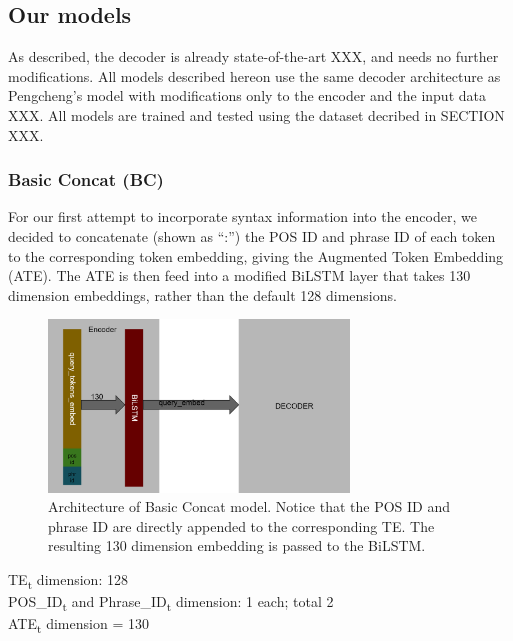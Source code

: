 \documentclass{IEEEtran}
\begin{document}
      \subsection{Our models}
      As described, the decoder is already state-of-the-art XXX, and needs no further 
      modifications. All models described hereon use the same decoder architecture as Pengcheng's 
      model with modifications only to the encoder and the input data XXX. All models are 
      trained and tested using the dataset decribed in SECTION XXX. \\

        \subsubsection{Basic Concat (BC)}
        For our first attempt to incorporate syntax information into the encoder, we decided to 
        concatenate (shown as ``:'') the POS ID and phrase ID of each token to the corresponding 
        token embedding, giving the Augmented Token Embedding (ATE). The ATE is then feed into 
        a modified BiLSTM layer that takes 130 dimension embeddings, rather than the default 128 
        dimensions. \\

        \begin{figure}[h]
          \centering
          \includegraphics[width=8cm]{bc.png}
          \caption{Architecture of Basic Concat model. Notice that the POS ID and phrase ID
          are directly appended to the corresponding TE. The resulting 130 dimension embedding
          is passed to the BiLSTM.}
          \label{fig:bc}
        \end{figure}

        \hspace*{-3.5mm}TE\textsubscript{t} dimension: 128 \\
        POS\_ID\textsubscript{t} and Phrase\_ID\textsubscript{t} dimension: 1 each; total 2 \\
        ATE\textsubscript{t} dimension = 130 \\
\end{document}
